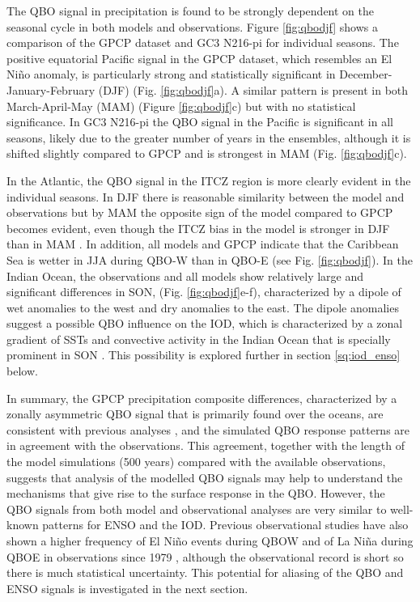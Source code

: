 The QBO signal in precipitation is found to be strongly dependent on the seasonal cycle in both models and observations. Figure \ref{fig:qbodjf} shows a comparison of the GPCP dataset and GC3 N216-pi for individual seasons. The positive equatorial Pacific signal in the GPCP dataset, which resembles an El Niño anomaly, is particularly strong and statistically significant in December-January-February (DJF) (Fig. \ref{fig:qbodjf}a). A similar pattern is present in both March-April-May (MAM) (Figure \ref{fig:qbodjf}c) but with no statistical significance. In GC3 N216-pi the QBO signal in the Pacific is significant in all seasons, likely due to the greater number of years in the ensembles, although it is shifted slightly compared to GPCP and is strongest in MAM (Fig. \ref{fig:qbodjf}c).   

In the Atlantic, the QBO signal in the ITCZ region is more clearly evident in the individual seasons. In DJF there is reasonable similarity between the model and observations but by MAM the opposite sign of the model compared to GPCP becomes evident, even though the ITCZ bias in the model is stronger in DJF than in MAM \citep{garciafranco2020}. In addition, all models and GPCP indicate that the Caribbean Sea is wetter in JJA during QBO-W than in QBO-E (see Fig. \ref{fig:qbodjf}). In the Indian Ocean, the observations and all models show relatively large and significant differences in SON, (Fig. \ref{fig:qbodjf}e-f), characterized by a dipole of wet anomalies to the west and dry anomalies to the east. The dipole anomalies suggest a possible QBO influence on the IOD, which is characterized by a zonal gradient of SSTs and convective activity in the Indian Ocean that is specially prominent in SON \citep{saji1999iod,deser2010sea,mckenna2020iod}. This possibility is explored further in section \ref{sq:iod_enso} below.  

In summary, the GPCP precipitation composite differences, characterized by a zonally asymmetric QBO signal that is primarily found over the oceans, are consistent with previous analyses \citep{liess2012,gray2018}, and the simulated QBO response patterns are in agreement with the observations. This agreement, together with the length of the model simulations (500 years) compared with the available observations, suggests that analysis of the modelled QBO signals may help to understand the mechanisms that give rise to the surface response in the QBO. However, the QBO signals from both model and observational analyses are very similar to well-known patterns for ENSO and the IOD. Previous observational studies have also shown a higher frequency of El Niño events during QBOW and of La Niña during QBOE in observations since 1979 \citep{taguchi2010,liess2012}, although the observational record is short so there is much statistical uncertainty. This potential for aliasing of the QBO and ENSO signals is investigated in the next section.

